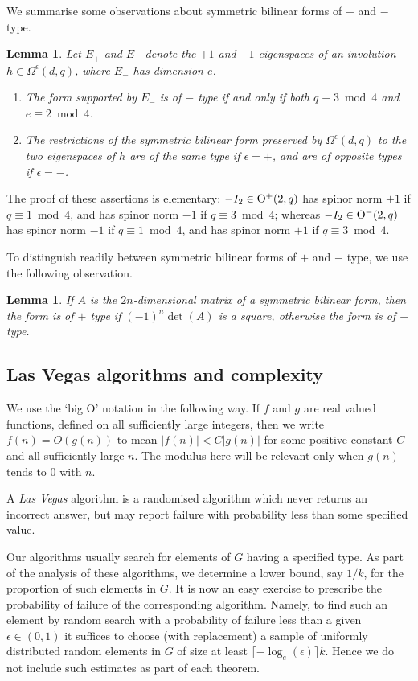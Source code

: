 \documentclass[12pt]{article}
\newtheorem{lemma}[definition]{Lemma}
\def\O{{\rm O}}  %
\def\Oh{O}  %
\begin{document}
We summarise some observations about 
symmetric bilinear forms of $+$ and $-$ type.
\begin{lemma} \label{form-type}
Let $E_+$ and $E_-$ denote the $+1$ and $-1$-eigenspaces  of 
an involution $h \in 
\Omega^\epsilon(d,q)$, where $E_-$ has dimension $e$.
\begin{enumerate}
\item[(i)]
The form supported by $E_-$ is of $-$ type if and only if
both $q\equiv3\bmod4$ and $e\equiv2\bmod4$.

\item[(ii)]
The restrictions of the symmetric bilinear form 
preserved by $\Omega^\epsilon(d,q)$ to the two eigenspaces 
of $h$ are of the same type if 
$\epsilon=+$, and are of opposite
types if $\epsilon = -$.
\end{enumerate}
\end{lemma}
The proof  of these assertions is elementary:
$-I_2\in\O^+(2,q)$ has spinor norm $+1$  if $q\equiv1\bmod4$, and  has
spinor norm $-1$  if $q\equiv3\bmod4$; whereas  $-I_2\in\O^-(2,q)$ has
spinor norm $-1$ if $q\equiv1\bmod4$, and has spinor norm $+1$  if
$q\equiv3\bmod4$.

To distinguish readily between symmetric bilinear forms of $+$ and $-$ type,
we use the following observation.
\begin{lemma}\label{square-det}
If $A$ is the $2n$-dimensional matrix of a symmetric bilinear form, 
then the form is of $+$ type if $(-1)^{n} \det (A)$ is a square,
otherwise the form is of $-$ type.
\end{lemma}

\subsection{Las Vegas algorithms and complexity}
We use the `big \Oh' notation in the following way.  
If $f$ and $g$ are real valued
functions, defined on all sufficiently large integers, then we write
$f(n)=\Oh(g(n))$ to mean $|f(n)|<C|g(n)|$ for some positive
constant $C$ and all sufficiently large $n$.
The modulus here will be relevant only when $g(n)$ tends 
to $0$ with $n$. %

A {\it Las Vegas} algorithm is a randomised algorithm 
which never returns an incorrect answer, but may report 
failure with probability less than some specified value.

Our algorithms usually search for elements of $G$ having 
a specified type.  As part of the analysis of these 
algorithms, we determine a lower bound, say $1/k$, 
for the proportion of such elements in $G$. 
It is now an easy exercise to prescribe the 
probability of failure of the corresponding algorithm. 
Namely, to find such an element by random
search with a probability of failure less 
than a given $\epsilon \in (0, 1)$
it suffices to choose (with replacement) a sample 
of uniformly distributed random elements in $G$ 
of size at least $\lceil -\log_e(\epsilon) \rceil k$.
Hence we do not include such estimates as 
part of each theorem.
\end{document}
